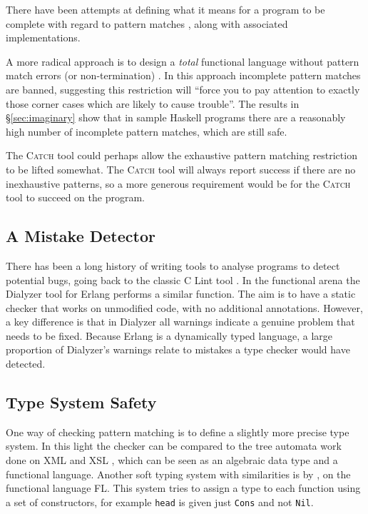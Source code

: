 \documentclass[preprint]{sigplanconf}
\newcommand{\T}[1]{\texttt{#1}}
\newcommand{\catch}{\textsc{Catch}}
\begin{document}
There have been attempts at defining what it means for a program to be complete with regard to pattern matches \citep{maranget:pattern_warnings}, along with associated implementations.

A more radical approach is to design a \textit{total} functional language without pattern match errors (or non-termination) \citep{turner:total}. In this approach incomplete pattern matches are banned, suggesting this restriction will ``force you to pay attention to exactly those corner cases which are likely to cause trouble''. The results in \S\ref{sec:imaginary} show that in sample Haskell programs there are a reasonably high number of incomplete pattern matches, which are still safe.

The \catch{} tool could perhaps allow the exhaustive pattern matching restriction to be lifted somewhat. The \catch{} tool will always report success if there are no inexhaustive patterns, so a more generous requirement would be for the \catch{} tool to succeed on the program.

\subsection{A Mistake Detector}

There has been a long history of writing tools to analyse programs to detect potential bugs, going back to the classic C Lint tool \citep{lint}. In the functional arena the Dialyzer tool \citep{dialyzer} for Erlang \citep{erlang} performs a similar function. The aim is to have a static checker that works on unmodified code, with no additional annotations. However, a key difference is that in Dialyzer all warnings indicate a genuine problem that needs to be fixed. Because Erlang is a dynamically typed language, a large proportion of Dialyzer's warnings relate to mistakes a type checker would have detected.

\subsection{Type System Safety}

One way of checking pattern matching is to define a slightly more precise type system. In this light the checker can be compared to the tree automata work done on XML and XSL \citep{static_xslt}, which can be seen as an algebraic data type and a functional language. Another soft typing system with similarities is by \citet{aiken:type_infer}, on the functional language FL. This system tries to assign a type to each function using a set of constructors, for example \T{head} is given just \T{Cons} and not \T{Nil}.
\end{document}

